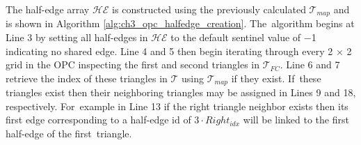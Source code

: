 \vspace{6pt}
The half-edge array $\mathcal{HE}$ is constructed 
using the previously calculated $\mathcal{T}_{map}$ and is shown in Algorithm \ref{alg:ch3_opc_halfedge_creation}. The~algorithm begins at Line 3 by setting all half-edges in $\mathcal{HE}$ to the default sentinel value of $-$1 indicating no shared edge.  Line 4 and 5 then begin iterating through every 2 $\times$ 2 grid in the OPC inspecting the first and second triangles in $\mathcal{T}_{FC}$. Line 6 and 7 retrieve the index of these triangles in $\mathcal{T}$ using $\mathcal{T}_{map}$ if they exist. If~these triangles exist then their neighboring triangles may be assigned in Lines 9 and 18, respectively. For~example in Line 13 if the right triangle neighbor exists then its first edge corresponding to a half-edge id of $3 \cdot Right_{idx}$ will be linked to the first half-edge of the first~triangle.

